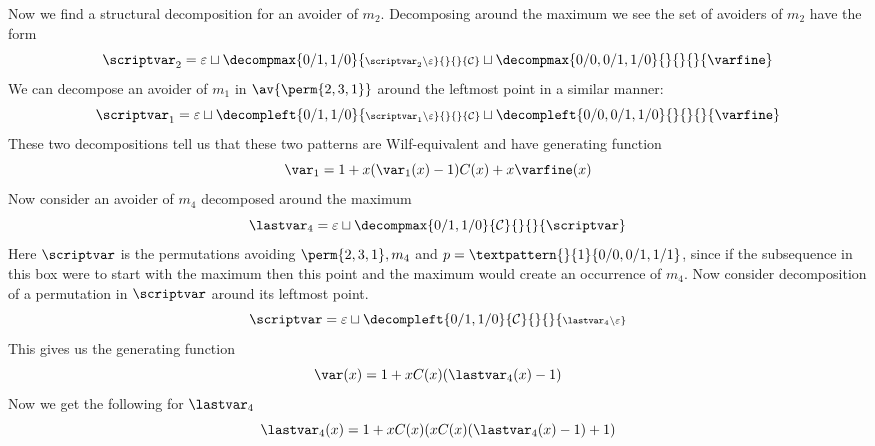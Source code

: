 Now we find a structural decomposition for an avoider of \(m_2\).
Decomposing around the maximum we see the set of avoiders of \(m_2\)
have the form
\begin{equation*}
    \scriptvar_2 = \varepsilon \sqcup
    \decompmax{0/1,1/0}{\scriptstyle\scriptvar_2\setminus\varepsilon}{}{}{\mathcal{C}}
    \sqcup
    \decompmax{0/0,0/1,1/0}{}{}{}{\mathcal{\varfine}}
\end{equation*}
We can decompose an avoider of \(m_1\) in \(\av{\perm{2,3,1}}\) around the leftmost point
in a similar manner:
\begin{equation*}
    \scriptvar_1 = \varepsilon \sqcup
    \decompleft{0/1,1/0}{\scriptstyle\scriptvar_1\setminus\varepsilon}{}{}{\mathcal{C}}
    \sqcup
    \decompleft{0/0,0/1,1/0}{}{}{}{\mathcal{\varfine}}
\end{equation*}
These two decompositions tell us that these two patterns are Wilf-equivalent
and have generating function
\begin{equation}
    \var_1 = 1 + x(\var_1(x)-1)C(x) +x\varfine(x)
    \label{eqn:ngen}
\end{equation}
Now consider an avoider of \(m_4\) decomposed around the maximum\nextvar %
\begin{equation*}
    \mathcal{\lastvar}_4 = \varepsilon \sqcup
    \decompmax{0/1,1/0}{\mathcal{C}}{}{}{\scriptvar}
\end{equation*}
Here \(\scriptvar\) is the permutations avoiding \(\perm{2,3,1},m_4\) and
\(p = \textpattern{}{1}{0/0,0/1,1/1}\), since if the subsequence in this box
were to start with the maximum then this point and the maximum would create
an occurrence of \(m_4\).
Now consider decomposition of a permutation in \(\scriptvar\) around its
leftmost point.
\begin{equation*}
    \scriptvar = \varepsilon \sqcup
    \decompleft{0/1,1/0}{\mathcal{C}}{}{}{\scriptstyle\mathcal{\lastvar}_4\setminus\varepsilon}
\end{equation*}
This gives us the generating function
\begin{equation*}
    \var(x) = 1 + xC(x)(\lastvar_4(x)-1)
\end{equation*}
Now we get the following for \(\lastvar_4\)
\begin{equation}
    \lastvar_4(x) = 1 +xC(x)(xC(x)(\lastvar_4(x)-1)+1)
    \label{eqn:ngen2}
\end{equation}


